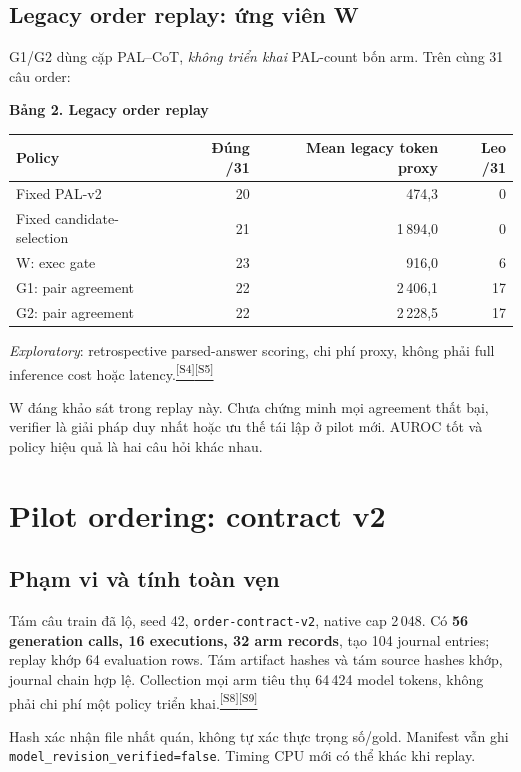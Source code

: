\documentclass[11pt,a4paper]{article}
\newcommand{\src}[1]{\hyperlink{src-#1}{\textcolor{muted}{\textsuperscript{[S#1]}}}}
\newcommand{\exploratory}{\textit{Exploratory}}
\newcommand{\tabletitle}[1]{\par\addvspace{5pt}\Needspace{6\baselineskip}
  {\sffamily\small\bfseries #1}\par\nobreak}
\begin{document}
\subsection{Legacy order replay: ứng viên W}
G1/G2 dùng cặp PAL--CoT, \emph{không triển khai} PAL-count bốn arm. Trên cùng 31 câu order:
\tabletitle{Bảng 2. Legacy order replay}
\begin{center}\small
\begin{tabular}{@{}lrrr@{}}
\toprule
\textbf{Policy} & \textbf{Đúng /31} & \textbf{Mean legacy token proxy} & \textbf{Leo /31}\\
\midrule
Fixed PAL-v2 & 20 & 474,3 & 0\\
Fixed candidate-selection & 21 & 1\,894,0 & 0\\
W: exec gate & 23 & 916,0 & 6\\
G1: pair agreement & 22 & 2\,406,1 & 17\\
G2: pair agreement & 22 & 2\,228,5 & 17\\
\bottomrule
\end{tabular}
\end{center}
\exploratory: retrospective parsed-answer scoring, chi phí proxy, không phải full inference cost hoặc latency.\src{4}\src{5}

W đáng khảo sát trong replay này. Chưa chứng minh mọi agreement thất bại, verifier là giải pháp duy nhất hoặc ưu thế tái lập ở pilot mới. AUROC tốt và policy hiệu quả là hai câu hỏi khác nhau.

\section{Pilot ordering: contract v2}
\subsection{Phạm vi và tính toàn vẹn}
Tám câu train đã lộ, seed 42, \texttt{order-contract-v2}, native cap 2\,048. Có \textbf{56 generation calls, 16 executions, 32 arm records}, tạo 104 journal entries; replay khớp 64 evaluation rows. Tám artifact hashes và tám source hashes khớp, journal chain hợp lệ. Collection mọi arm tiêu thụ 64\,424 model tokens, không phải chi phí một policy triển khai.\src{8}\src{9}

Hash xác nhận file nhất quán, không tự xác thực trọng số/gold. Manifest vẫn ghi \texttt{model\_revision\_verified=false}. Timing CPU mới có thể khác khi replay.
\end{document}

